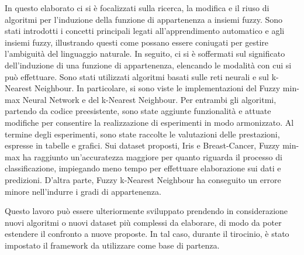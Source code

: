 \documentclass[11pt,  oneside, openany]{book}
\begin{document}
In questo elaborato ci si è focalizzati sulla ricerca, la modifica e il riuso di algoritmi per l'induzione della funzione di appartenenza a insiemi fuzzy. Sono stati introdotti i concetti principali legati all'apprendimento automatico e agli insiemi fuzzy, illustrando questi come possano essere coniugati per gestire l'ambiguità del linguaggio naturale. In seguito, ci si è soffermati sul significato dell'induzione di una funzione di appartenenza, elencando le modalità con cui si può effettuare. Sono stati utilizzati algoritmi basati sulle reti neurali e sul k-Nearest Neighbour. In particolare, si sono viste le implementazioni del Fuzzy min-max Neural Network e del k-Nearest Neighbour. Per entrambi gli algoritmi, partendo da codice preesistente, sono state aggiunte funzionalità e attuate modifiche per consentire la realizzazione di esperimenti in modo armonizzato. Al termine degli esperimenti, sono state raccolte le valutazioni delle prestazioni, espresse in tabelle e grafici. Sui dataset proposti, Iris e Breast-Cancer, Fuzzy min-max ha raggiunto un'accuratezza maggiore per quanto riguarda il processo di classificazione, impiegando meno tempo per effettuare elaborazione sui dati e predizioni. D'altra parte, Fuzzy k-Nearest Neighbour ha conseguito un errore minore nell'indurre i gradi di appartenenza. 

Questo lavoro può essere ulteriormente sviluppato prendendo in considerazione nuovi algoritmi o nuovi dataset più complessi da elaborare, di modo da poter estendere il confronto a nuove proposte. In tal caso, durante il tirocinio, è stato impostato il framework da utilizzare come base di partenza.




\end{document}
